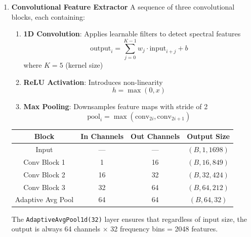 \begin{enumerate}
    \item \textbf{Convolutional Feature Extractor}
    A sequence of three convolutional blocks, each containing:
    \begin{enumerate}
        \item \textbf{1D Convolution}: Applies learnable filters to detect spectral features
        \begin{equation}\label{conv1d}
            \text{output}_i = \sum_{j=0}^{K-1} w_j \cdot \text{input}_{i+j} + b
        \end{equation}
        where $K=5$ (kernel size)
        
        \item \textbf{ReLU Activation}: Introduces non-linearity
        \begin{equation}\label{relu}
            h = \max(0, x)
        \end{equation}
        
        \item \textbf{Max Pooling}: Downsamples feature maps with stride of 2
        \begin{equation}\label{max_pool}
            \text{pool}_i = \max(\text{conv}_{2i}, \text{conv}_{2i+1})
        \end{equation}
    \end{enumerate}

    \begin{center}
        \begin{tabular}{|c|c|c|c|}
        \hline
        \textbf{Block} & \textbf{In Channels} & \textbf{Out Channels} & \textbf{Output Size} \\
        \hline
            Input & — & — & $(B, 1, 1698)$ \\
            Conv Block 1 & 1 & 16 & $(B, 16, 849)$ \\
            Conv Block 2 & 16 & 32 & $(B, 32, 424)$ \\
            Conv Block 3 & 32 & 64 & $(B, 64, 212)$ \\
            Adaptive Avg Pool & 64 & 64 & $(B, 64, 32)$ \\
        \hline
        \end{tabular}
    \end{center}

    The \verb|AdaptiveAvgPool1d(32)| layer ensures that regardless of input size, the output is always 
    64 channels \(\times\) 32 frequency bins = 2048 features. \\


\end{enumerate}

